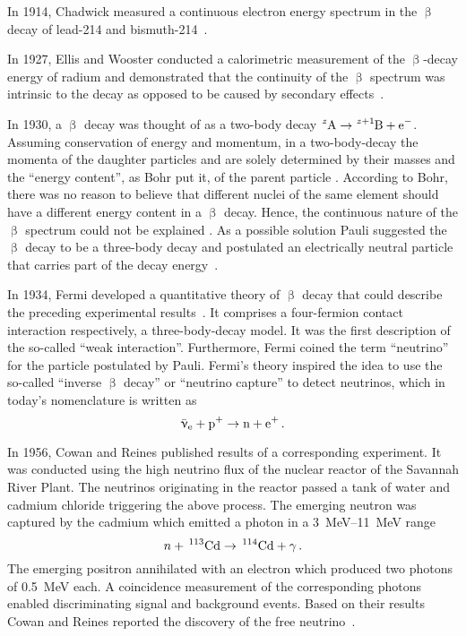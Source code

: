 In 1914, Chadwick measured a continuous electron energy spectrum in the $\upbeta$ decay of lead-214 and bismuth-214~\cite{Chadwick:1}. 

In 1927, Ellis and Wooster conducted a calorimetric measurement of the $\upbeta$-decay energy of radium and demonstrated that the continuity of the $\upbeta$ spectrum was intrinsic to the decay as opposed to be caused by secondary effects~\cite{Ellis:1}. 

In 1930, a $\upbeta$ decay was thought of as a two-body decay $\ce{^zA} \rightarrow \ce{^{z+1}B} + \ce{e^-}$. Assuming conservation of energy and momentum, in a two-body-decay the momenta of the daughter particles  and  are solely determined by their masses and the ``energy content'', as Bohr put it, of the parent particle . According to Bohr, there was no reason to believe that different nuclei of the same element  should have a different energy content in a $\upbeta$ decay. Hence, the continuous nature of the $\upbeta$ spectrum could not be explained \cite{Bohr:1}. As a possible solution Pauli suggested the $\upbeta$ decay to be a three-body decay and postulated an electrically neutral particle that carries part of the decay energy~\cite{Pauli1930}. 

In 1934, Fermi developed a quantitative theory of $\upbeta$ decay that could describe the preceding experimental results~\cite{Fermi1934}. It comprises a four-fermion contact interaction respectively, a three-body-decay model. It was the first description of the so-called ``weak interaction''. Furthermore, Fermi coined the term ``neutrino'' for the particle postulated by Pauli. Fermi's theory inspired the idea to use the so-called ``inverse $\upbeta$ decay'' or ``neutrino capture'' to detect neutrinos, which in today's nomenclature is written as
\begin{equation*}
    \aeneutrino + \ce{p^+} \rightarrow \ce{n} + \ce{e^+} \fullstop
\end{equation*}

In 1956, Cowan and Reines published results of a corresponding experiment. It was conducted using the high neutrino flux of the nuclear reactor of the Savannah River Plant. The neutrinos originating in the reactor passed a tank of water and cadmium chloride triggering the above process. The emerging neutron was captured by the cadmium which emitted a photon in a \SIrange{3}{11}{MeV} range
\begin{equation*}
	n+\,^{113}\mathrm{Cd}\rightarrow \,^{114}\mathrm{Cd}+\gamma
	\text{\,.}
\end{equation*}
The emerging positron annihilated with an electron which produced two photons of \SI{0.5}{MeV} each. A coincidence measurement of the corresponding photons enabled discriminating signal and background events. Based on their results Cowan and Reines reported the discovery of the free neutrino~\cite{Cowan103}. 

